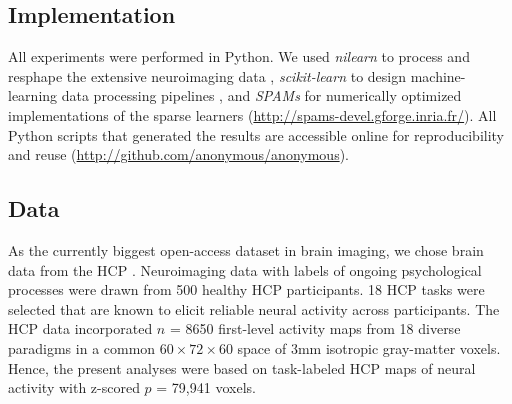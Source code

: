 \documentclass[runningheads,a4paper]{llncs}
\begin{document}
\subsection{Implementation}
All experiments were performed in Python.
We used \textit{nilearn} to process and resphape
the extensive neuroimaging data 
\cite{abrah14},
\textit{scikit-learn} to design machine-learning
data processing pipelines
\cite{pedr11},
and
\textit{SPAMs} for numerically optimized
implementations of the sparse learners
(\url{http://spams-devel.gforge.inria.fr/}).
All Python scripts that generated the results are
accessible online for reproducibility and reuse
(\url{http://github.com/anonymous/anonymous}).
\nopagebreak
\subsection{Data}
As the currently biggest open-access dataset in brain imaging,
we chose brain data from the HCP
\cite{barch2013}.
Neuroimaging data with labels of ongoing psychological processes
were drawn from 500
healthy HCP participants.
18 HCP tasks 
were selected that are known to elicit reliable neural activity
across participants.
The HCP data incorporated $n$ = 8650 first-level activity maps
from 18 diverse paradigms in a common $60\times72\times60$ space of
3mm isotropic gray-matter voxels.
Hence,
the present analyses were based on task-labeled HCP maps of neural
activity with z-scored $p$ = 79,941 voxels.
\end{document}
